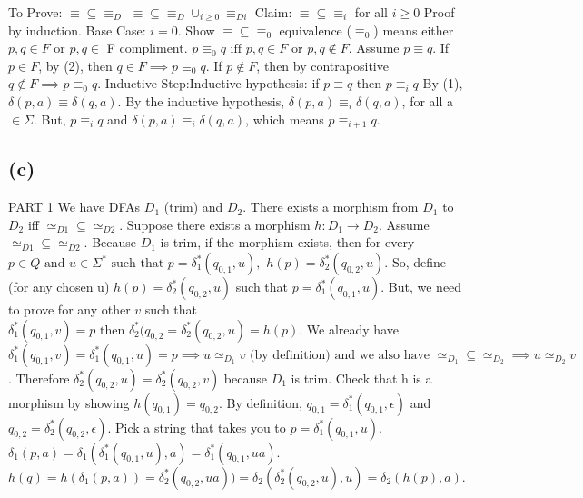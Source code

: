\documentclass[12pt]{article}
\begin{document}
To Prove: $ \equiv \subseteq \equiv_D$
$\equiv \subseteq \equiv_D \cup_{i \ge 0} \equiv_{Di}$
Claim: $\equiv \subseteq \equiv_i $ for all $i \ge 0$
Proof by induction. \newline
Base Case: $i = 0$.   Show $\equiv \subseteq \equiv_0 $  equivalence ($\equiv_0 $) means either $p,q \in F$ or $p,q \in$ F compliment. 
\newline $p \equiv_{0} q \text{ iff } p,q \in F \text{ or } p,q \notin F $.  
\newline
Assume $p \equiv q$. If $p \in F$, by (2), then $q \in F \implies p \equiv_0 q$. If $p \not \in F$, then by contrapositive $q \not\in F \implies p \equiv_0 q$. 
\newline
Inductive Step:\newline Inductive hypothesis: if $p \equiv q$ then $p \equiv_i q$\newline
By (1), $\delta (p,a) \equiv \delta (q,a)$. By the inductive hypothesis, $\delta (p,a) \equiv_i \delta (q,a)$, for all a $ \in \Sigma$. But, $p \equiv_i q$ and 
$\delta(p,a) \equiv_i \delta(q,a)$, which means $p \equiv_{i+1} q$.

\subsection*{(c)}
PART 1\newline
We have DFAs $D_1$ (trim) and $D_2$. There exists a morphism from $D_1$ to $D_2$
iff $\simeq_{D1} \subseteq \simeq_{D2}$. Suppose there exists a morphism $h:D_1 \rightarrow D_2$. Assume $\simeq_{D1} \subseteq \simeq_{D2}$. Because $D_1$ is
trim, if the morphism exists, then for every $p \in Q \text{ and } u
 \in \Sigma^{*} \text{ such that } p = \delta_1^{*}(q_{0,1}, u),$ $ 
h(p) = \delta^{*}_2(q_{0,2}, u)$.\newline
So, define (for any chosen u) $h(p) = \delta^{*}_2(q_{0,2}, u)$ such
 that $p = \delta^{*}_1(q_{0,1}, u)$.
But, we need to prove for any other $v$ such that $\delta^{*}_1(q_{0,1}, v) = p 
\text{ then } \delta^{*}_2 (q_{0,2} = \delta^{*}_2(q_{0,2}, u) = h(p)$.
We already have $\delta^{*}_1(q_{0,1} , v) = \delta^{*}_1(q_{0,1}, u) = p
\implies u \simeq_{D_1} v \text{ (by definition) and we also have } 
\simeq_{D_1} \subseteq \simeq_{D_2} \implies  u \simeq_{D_2} v$.
Therefore $\delta^{*}_2(q_{0,2} , u) = \delta^{*}_2(q_{0,2}, v)$ because $D_1$ is trim. \newline
Check that h is a morphism by showing $h(q_{0,1})=q_{0,2}$. By definition,
$q_{0,1}=\delta^{*}_1(q_{0,1} , \epsilon )$ and 
$q_{0,2}=\delta^{*}_2(q_{0,2} , \epsilon )$.
Pick a string that takes you to $p=\delta^{*}_1(q_{0,1}, u)$. \newline
$\delta_1(p,a) = \delta_1(\delta^{*}_1(q_{0,1} , u), a) =
\delta^{*}_1(q_{0,1}, ua)$. \newline
$h(q)=h(\delta_1(p,a))=\delta^{*}_2(q_{0,2}, ua) )=
\delta_2(\delta^{*}_2(q_{0,2}, u), u)
= \delta_2(h(p),a)$. 
\end{document}
